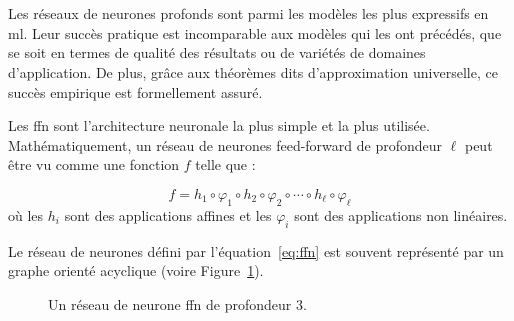 \section{}

Les réseaux de neurones profonds sont parmi les modèles les plus expressifs en \acrshort{ml}.
Leur succès pratique est incomparable aux modèles qui les ont précédés, 
que se soit en termes de qualité des résultats ou de variétés de domaines d'application.
De plus, grâce aux théorèmes dits d'approximation universelle, ce succès empirique est formellement assuré.

Les \acrshort{ffn} sont l'architecture neuronale la plus simple et la plus utilisée.
Mathématiquement, un réseau de neurones feed-forward de profondeur \(\ell\) 
peut être vu comme une fonction \(f\) telle que :

\begin{equation}
    \label{eq:ffn}
    f = h_1 \circ \varphi_1 \circ h_2 \circ \varphi_2 \circ \cdots \circ h_\ell \circ \varphi_\ell
\end{equation}
où les \(h_i\) sont des applications affines et les \(\varphi_i\) sont des applications non linéaires.

Le réseau de neurones défini par l'équation~\ref{eq:ffn} 
est souvent représenté par un graphe orienté acyclique (voire Figure~\ref{fig:ffn}).

\begin{figure}[hbt]
    \begin{center}
        
    \end{center}
    \caption{Un réseau de neurone \acrshort{ffn} de profondeur 3.}
    \label{fig:ffn}
\end{figure}
